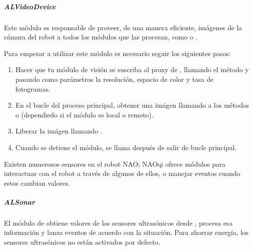 \subparagraph{ALVideoDevice}
\label{\detokenize{chapter_one/naoqi:alvideodevice}}
Este módulo es responsable de proveer, de una manera eficiente, imágenes de la
cámara del robot a todos los módulos que las procesan, como 
o .


Para empezar a utilizar este módulo es necesario seguir los siguientes pasos:
\begin{enumerate}
\item {} 
Hacer que tu módulo de visión se suscriba al proxy de , llamando el método  y pasando como parámetros la resolución, espacio de color y tasa de fotogramas.

\item {} 
En el bucle del proceso principal, obtener una imágen llamando a los métodos  o  (dependiedo si el módulo es local o remoto).

\item {} 
Liberar la imágen llamando .

\item {} 
Cuando se detiene el módulo, se llama  después de salir de bucle principal.

\end{enumerate}

Existen numerosos sensores en el robot NAO; NAOqi ofrece módulos para interactuar
con el robot a través de algunos de ellos, o manejar eventos cuando estos
cambian valores.


\subparagraph{ALSonar}
\label{\detokenize{chapter_one/naoqi:alsonar}}
El módulo de  obtiene valores de los sensores ultrasónicos desde
, procesa esa información y lanza eventos de acuerdo con la situación.
Para ahorrar energía, los sensores ultrasónicos no están activados por defecto.

